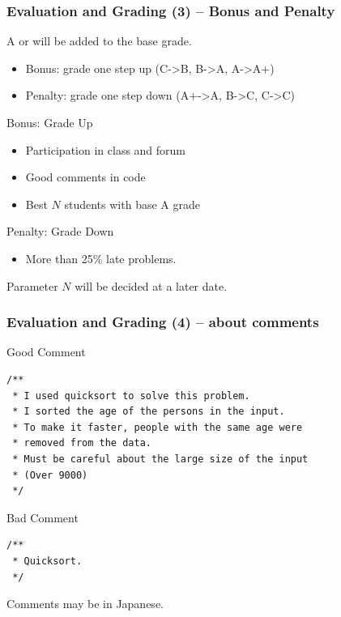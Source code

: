 \documentclass{beamer}
\begin{document}
\begin{frame}
  \frametitle{Evaluation and Grading (3) -- Bonus and Penalty}
  
  {\small
  A  or  will be added to the base grade.
  \begin{itemize}
    \item Bonus: grade one step up (C->B, B->A, A->A+)
    \item Penalty: grade one step down (A+->A, B->C, \alert{C->C})
  \end{itemize}
  }

  \medskip
  \begin{exampleblock}{Bonus: Grade Up}
    \begin{itemize}
    \item Participation in class and forum
    \item Good comments in code
    \item Best $N$ students with base A grade
    \end{itemize}
  \end{exampleblock}
  \begin{alertblock}{Penalty: Grade Down}
    \begin{itemize}
    \item More than 25\% late problems.
    \end{itemize}
  \end{alertblock}

  \tiny{Parameter $N$ will be decided at a later date.}
\end{frame}

\begin{frame}
  \frametitle{Evaluation and Grading (4) -- about comments}

  \begin{exampleblock}{Good Comment}
    {\smaller
\begin{verbatim}
/**
 * I used quicksort to solve this problem. 
 * I sorted the age of the persons in the input.
 * To make it faster, people with the same age were 
 * removed from the data.
 * Must be careful about the large size of the input 
 * (Over 9000)
 */
\end{verbatim}}
  \end{exampleblock}
  \begin{alertblock}{Bad Comment}
{\smaller
\begin{verbatim}
/**
 * Quicksort.
 */
\end{verbatim}}
  \end{alertblock}

  Comments may be in Japanese.
\end{frame}
\end{document}
